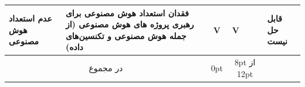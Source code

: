 \documentclass[a4paper,10pt]{article}
\begin{document}
\begin{table}
\begin{tabularx}{\textwidth}{ p{1.5cm} p{6.5cm} c c c c p{5.5cm} }
                            عدم استعداد هوش مصنوعی & فقدان استعداد هوش مصنوعی برای رهبری پروژه های هوش مصنوعی (از جمله هوش مصنوعی و تکنسین‌های داده) & V & V &  &  & قابل حل نیست \\

                            \hline

                            \multicolumn{2}{c}{در مجموع} & 0pt & \multicolumn{3}{c}{8pt از 12pt} \\

                            \hline

                        \end{tabularx}

                    \end{table}

                    
\end{document}
